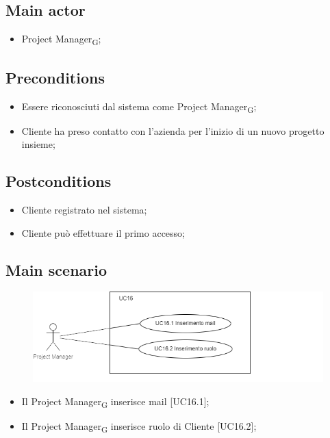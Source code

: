 \documentclass{article}
\begin{document}
    \subsection*{Main actor}
        \begin{itemize}
            \item Project Manager\textsubscript{G};
        \end{itemize}
        
    \subsection*{Preconditions}
        \begin{itemize}
            \item Essere riconosciuti dal sistema come Project Manager\textsubscript{G};
            \item Cliente ha preso contatto con l'azienda per l'inizio di un nuovo progetto insieme;
        \end{itemize}
        
    \subsection*{Postconditions}
        \begin{itemize}
            \item Cliente registrato nel sistema;
            \item Cliente può effettuare il primo accesso;
        \end{itemize}
    
    \subsection*{Main scenario}
        \begin{figure}[h]
          \centering
          \includegraphics{./imgUML/UC16-zoom.png}
          \label{fig:immagine}
        \end{figure}
        
        \begin{itemize}
            \item Il Project Manager\textsubscript{G} inserisce mail [UC16.1];
            \item Il Project Manager\textsubscript{G} inserisce ruolo di Cliente [UC16.2];
        \end{itemize}
        
\end{document}
